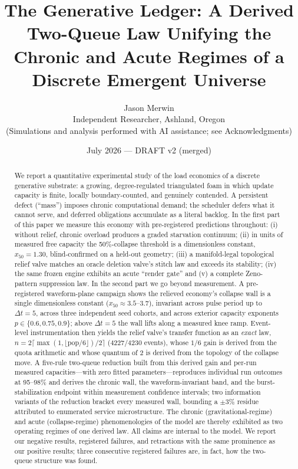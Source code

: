 \documentclass[11pt]{article}
\title{The Generative Ledger: A Derived Two-Queue Law Unifying the\\
Chronic and Acute Regimes of a Discrete Emergent Universe}
\author{Jason Merwin\\
\small Independent Researcher, Ashland, Oregon\\
\small (Simulations and analysis performed with AI assistance; see Acknowledgments)}
\date{July 2026 --- DRAFT v2 (merged)}
\newcommand{\dt}{\Delta t}
\begin{document}
\maketitle

\begin{abstract}
We report a quantitative experimental study of the load economics of a discrete
generative substrate: a growing, degree-regulated triangulated foam in which
update capacity is finite, locally boundary-counted, and genuinely contended. A
persistent defect (``mass'') imposes chronic computational demand; the scheduler
defers what it cannot serve, and deferred obligations accumulate as a literal
backlog. In the first part of this paper we measure this economy with
pre-registered predictions throughout: (i) without relief, chronic overload
produces a graded starvation continuum; (ii) in units of measured free capacity
the 50\%-collapse threshold is a dimensionless constant, $x_{50}=1.30$,
blind-confirmed on a held-out geometry; (iii) a manifold-legal topological
relief valve matches an oracle deletion valve's stitch law and exceeds its
stability; (iv) the same frozen engine exhibits an acute ``render gate'' and
(v) a complete Zeno-pattern suppression law. In the second part we go beyond
measurement. A pre-registered waveform-plane campaign shows the relieved
economy's collapse wall is a single dimensionless constant
($x_{50}\approx3.5$--$3.7$), invariant across pulse period up to $\dt=5$,
across three independent seed cohorts, and across exterior capacity exponents
$p\in\{0.6,0.75,0.9\}$; above $\dt=5$ the wall lifts along a measured knee
ramp. Event-level instrumentation then yields the relief valve's transfer
function as an \emph{exact} law, $n = 2\lceil\max(1,\lfloor \mathrm{pop}/6
\rfloor)/2\rceil$ (4227/4230 events), whose $1/6$ gain is derived from the
quota arithmetic and whose quantum of 2 is derived from the topology of the
collapse move. A five-rule two-queue reduction built from this derived gain and
per-run measured capacities---with zero fitted parameters---reproduces
individual run outcomes at 95--98\% and derives the chronic wall, the
waveform-invariant band, and the burst-stabilization endpoint within
measurement confidence intervals; two information variants of the reduction
bracket every measured wall, bounding a $\pm3\%$ residue attributed to
enumerated service microstructure. The chronic (gravitational-regime) and
acute (collapse-regime) phenomenologies of the model are thereby exhibited as
two operating regimes of one derived law. All claims are internal to the
model. We report our negative results, registered failures, and retractions
with the same prominence as our positive results; three consecutive registered
failures are, in fact, how the two-queue structure was found.
\end{abstract}
\end{document}
